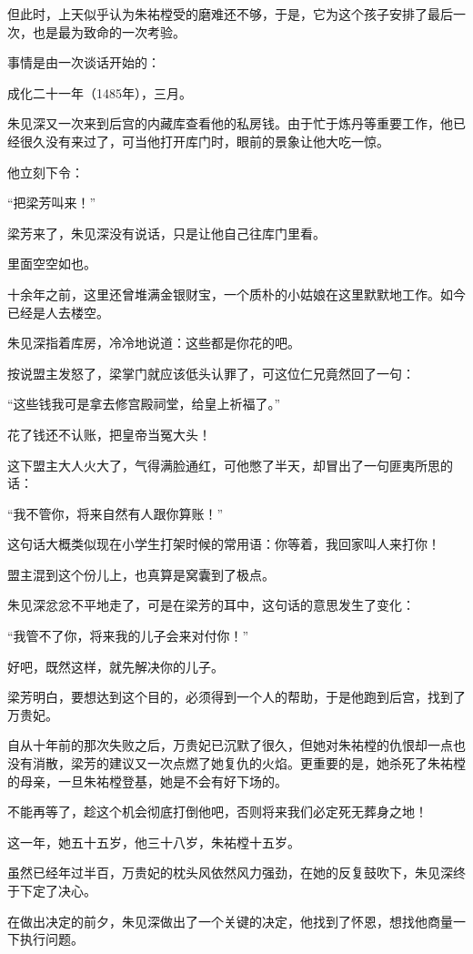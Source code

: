 \begin{multicols}{\theparacolNo}
		但此时，上天似乎认为朱祐樘受的磨难还不够，于是，它为这个孩子安排了最后一次，也是最为致命的一次考验。

		事情是由一次谈话开始的：

		成化二十一年（1485年），三月。

		朱见深又一次来到后宫的内藏库查看他的私房钱。由于忙于炼丹等重要工作，他已经很久没有来过了，可当他打开库门时，眼前的景象让他大吃一惊。

		他立刻下令：

		“把梁芳叫来！”

		梁芳来了，朱见深没有说话，只是让他自己往库门里看。

		里面空空如也。

		十余年之前，这里还曾堆满金银财宝，一个质朴的小姑娘在这里默默地工作。如今已经是人去楼空。

		朱见深指着库房，冷冷地说道：这些都是你花的吧。

		按说盟主发怒了，梁掌门就应该低头认罪了，可这位仁兄竟然回了一句：

		“这些钱我可是拿去修宫殿祠堂，给皇上祈福了。”

		花了钱还不认账，把皇帝当冤大头！

		这下盟主大人火大了，气得满脸通红，可他憋了半天，却冒出了一句匪夷所思的话：

		“我不管你，将来自然有人跟你算账！”

		这句话大概类似现在小学生打架时候的常用语：你等着，我回家叫人来打你！

		盟主混到这个份儿上，也真算是窝囊到了极点。

		朱见深忿忿不平地走了，可是在梁芳的耳中，这句话的意思发生了变化：

		“我管不了你，将来我的儿子会来对付你！”

		好吧，既然这样，就先解决你的儿子。

		梁芳明白，要想达到这个目的，必须得到一个人的帮助，于是他跑到后宫，找到了万贵妃。

		自从十年前的那次失败之后，万贵妃已沉默了很久，但她对朱祐樘的仇恨却一点也没有消散，梁芳的建议又一次点燃了她复仇的火焰。更重要的是，她杀死了朱祐樘的母亲，一旦朱祐樘登基，她是不会有好下场的。

		不能再等了，趁这个机会彻底打倒他吧，否则将来我们必定死无葬身之地！

		这一年，她五十五岁，他三十八岁，朱祐樘十五岁。

		虽然已经年过半百，万贵妃的枕头风依然风力强劲，在她的反复鼓吹下，朱见深终于下定了决心。

		在做出决定的前夕，朱见深做出了一个关键的决定，他找到了怀恩，想找他商量一下执行问题。


\end{multicols}
